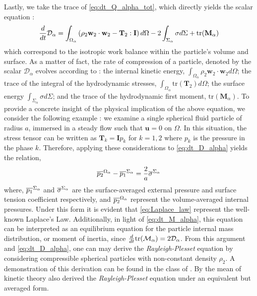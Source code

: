 Lastly, we take the trace of \ref{eq:dt_Q_alpha_tot}, which directly yields the scalar equation :
\begin{equation}
    \frac{d}{d t} \mathcal{D}_\alpha
    = \int_{\Omega_\alpha} \left(
        \rho_2 \textbf{w}_2 \cdot \textbf{w}_2
        - \mathbf{T}_2 : \textbf{I}
        \right) d\Omega
        - 2\int_{\Sigma_\alpha} \sigma d\Sigma
        + \text{tr}(\textbf{M}_\alpha)
    \label{eq:dt_D_alpha}
\end{equation}
which correspond to the isotropic work balance within the particle's volume and surface. 
As a matter of fact, the rate of compression of a particle, denoted by the scalar $\mathcal{D}_\alpha$ evolves according to : 
the internal kinetic energy, $\int_{\Omega_\alpha}\rho_2 \textbf{w}_2 \cdot \textbf{w}_2 d\Omega$;
the trace of the integral of the hydrodynamic stresses, $\int_{\Omega_\alpha} \text{tr}(\textbf{T}_2)d\Omega$; 
the surface energy $\int_{\Sigma_\alpha} \sigma d\Sigma$; 
and the trace of the hydrodynamic first moment, $\text{tr}(\textbf{M}_\alpha)$.
To provide a concrete insight of the physical implication of the above equation, we consider the following example :
we examine a single spherical fluid particle of radius $a$, immersed in a steady flow such that $\textbf{u} = 0$ on $\Omega$. 
In this situation, the stress tensor can be written as $\textbf{T}_k = \textbf{I} p_k$ for $k = 1, 2$ where $p_k$ is the pressure in the phase $k$. 
Therefore, applying these considerations to \ref{eq:dt_D_alpha} yields the relation, 
\begin{equation*}
    \overline{p_2}^{\Omega_\alpha} 
    - \overline{p_1}^{\Sigma_\alpha}
    =
    \frac{2}{a} \overline{\sigma}^{\Sigma_\alpha}
    \label{eq:Laplace_law}
\end{equation*}
where,  $\overline{p_1}^{\Sigma_\alpha}$ and  $\overline{\sigma}^{\Sigma_\alpha}$ are the surface-averaged external pressure and surface tension coefficient respectively, and $\overline{p_2}^{\Omega_\alpha}$ represent the volume-averaged internal pressures.
Under this form it is evident that \ref{eq:Laplace_law} represent the well-known Laplace's Law. 
Additionally, in light of \ref{eq:dt_M_alpha}, this equation can be interpreted as an equilibrium equation for the particle internal mass distribution, or moment of inertia, since $\frac{d}{d t}\text{tr}(\mathcal{M}_\alpha) = 2 \mathcal{D}_\alpha$. 
From this argument and \ref{eq:dt_D_alpha}, one can may derive the \textit{Rayleigh-Plesset} equation by considering compressible spherical particles with non-constant density $\rho_2$.
A demonstration of this derivation can be found in the class of . 
By the mean of kinetic theory \citet{zhang1994averaged} also derived the \textit{Rayleigh-Plesset} equation under an equivalent but averaged form.


